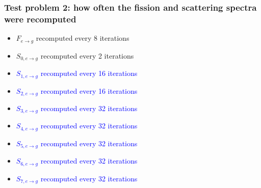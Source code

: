 \documentclass[xcolor=dvipsnames]{beamer}
\newlength{\wideitemsep}
\let\olditem\item
\renewcommand{\item}{\setlength{\itemsep}{\wideitemsep}\olditem}
\begin{document}
\begin{frame}
  \frametitle{Test problem 2: how often the fission and scattering spectra were recomputed}
\begin{itemize}
\item $F_{e \to g}$ recomputed every 8 iterations
\item $S_{0,e \to g}$ recomputed every 2 iterations
\item \textcolor{blue}{$S_{1,e \to g}$ recomputed every 16 iterations}
\item \textcolor{blue}{$S_{2,e \to g}$ recomputed every 16 iterations}
\item \textcolor{blue}{$S_{3,e \to g}$ recomputed every 32 iterations}
\item \textcolor{blue}{$S_{4,e \to g}$ recomputed every 32 iterations}
\item \textcolor{blue}{$S_{5,e \to g}$ recomputed every 32 iterations}
\item \textcolor{blue}{$S_{6,e \to g}$ recomputed every 32 iterations}
\item \textcolor{blue}{$S_{7,e \to g}$ recomputed every 32 iterations}
\end{itemize}
\end{frame}
\end{document}
